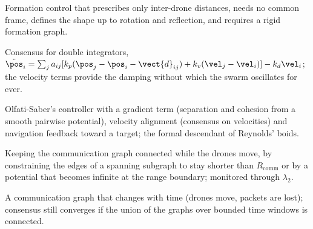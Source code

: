 \item[Distance-based formation control] Formation control that prescribes only inter-drone distances, needs no common frame, defines the shape up to rotation and reflection, and requires a rigid formation graph.
\item[Second-order consensus] Consensus for double integrators, $\ddot{\pos}_i=\sum_j a_{ij}[k_p(\pos_j-\pos_i-\vect{d}_{ij})+k_v(\vel_j-\vel_i)]-k_d\vel_i$; the velocity terms provide the damping without which the swarm oscillates for ever.
\item[Flocking] Olfati-Saber's controller with a gradient term (separation and cohesion from a smooth pairwise potential), velocity alignment (consensus on velocities) and navigation feedback toward a target; the formal descendant of Reynolds' boids.
\item[Connectivity maintenance] Keeping the communication graph connected while the drones move, by constraining the edges of a spanning subgraph to stay shorter than $R_{\mathrm{comm}}$ or by a potential that becomes infinite at the range boundary; monitored through $\lambda_2$.
\item[Switching topology] A communication graph that changes with time (drones move, packets are lost); consensus still converges if the union of the graphs over bounded time windows is connected.
